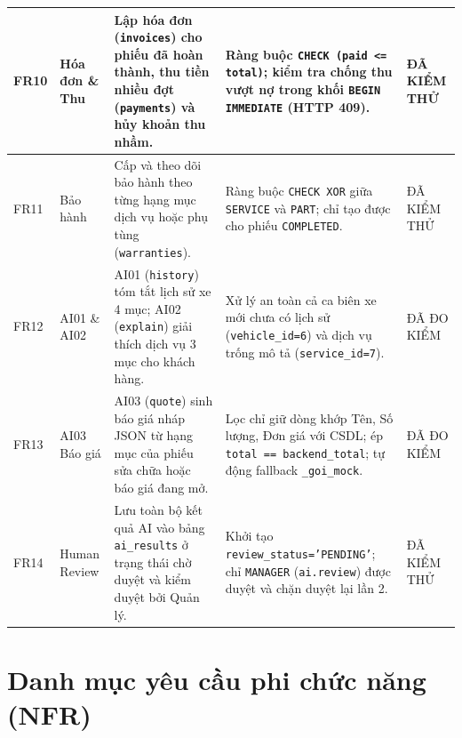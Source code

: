 \begin{small}
\begin{longtable}{|C{1.0cm}|L{2.1cm}|L{3.9cm}|L{4.6cm}|C{2.1cm}|}
\hline
FR10 & Hóa đơn \& Thu & Lập hóa đơn (\texttt{invoices}) cho phiếu đã hoàn thành, thu tiền nhiều đợt (\texttt{payments}) và hủy khoản thu nhầm. & Ràng buộc \texttt{CHECK (paid <= total)}; kiểm tra chống thu vượt nợ trong khối \texttt{BEGIN IMMEDIATE} (HTTP 409). & ĐÃ KIỂM THỬ\\
\hline
FR11 & Bảo hành & Cấp và theo dõi bảo hành theo từng hạng mục dịch vụ hoặc phụ tùng (\texttt{warranties}). & Ràng buộc \texttt{CHECK XOR} giữa \texttt{SERVICE} và \texttt{PART}; chỉ tạo được cho phiếu \texttt{COMPLETED}. & ĐÃ KIỂM THỬ\\
\hline
FR12 & AI01 \& AI02 & AI01 (\texttt{history}) tóm tắt lịch sử xe 4 mục; AI02 (\texttt{explain}) giải thích dịch vụ 3 mục cho khách hàng. & Xử lý an toàn cả ca biên xe mới chưa có lịch sử (\texttt{vehicle\_id=6}) và dịch vụ trống mô tả (\texttt{service\_id=7}). & ĐÃ ĐO KIỂM\\
\hline
FR13 & AI03 Báo giá & AI03 (\texttt{quote}) sinh báo giá nháp JSON từ hạng mục của phiếu sửa chữa hoặc báo giá đang mở. & Lọc chỉ giữ dòng khớp Tên, Số lượng, Đơn giá với CSDL; ép \texttt{total == backend\_total}; tự động fallback \texttt{\_goi\_mock}. & ĐÃ ĐO KIỂM\\
\hline
FR14 & Human Review & Lưu toàn bộ kết quả AI vào bảng \texttt{ai\_results} ở trạng thái chờ duyệt và kiểm duyệt bởi Quản lý. & Khởi tạo \texttt{review\_status='PENDING'}; chỉ \texttt{MANAGER} (\texttt{ai.review}) được duyệt và chặn duyệt lại lần 2. & ĐÃ KIỂM THỬ\\
\hline
\end{longtable}
\end{small}

\section{Danh mục yêu cầu phi chức năng (NFR)}


